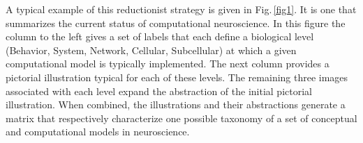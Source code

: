 \documentclass[10pt,letterpaper]{article}
\begin{document}


A typical example of this reductionist strategy is given in Fig.\,\ref{fig1}. It is one that summarizes the current status of computational neuroscience. In this figure the column to the left gives a set of labels that each define a biological level (Behavior, System, Network, Cellular, Subcellular) at which a given computational model is typically implemented. The next column provides a pictorial illustration typical for each of these levels. The remaining three images associated with each level expand the abstraction of the initial pictorial illustration. When combined, the illustrations and their abstractions generate a matrix that respectively characterize one possible taxonomy of a set of conceptual and computational models in neuroscience.
\end{document}
